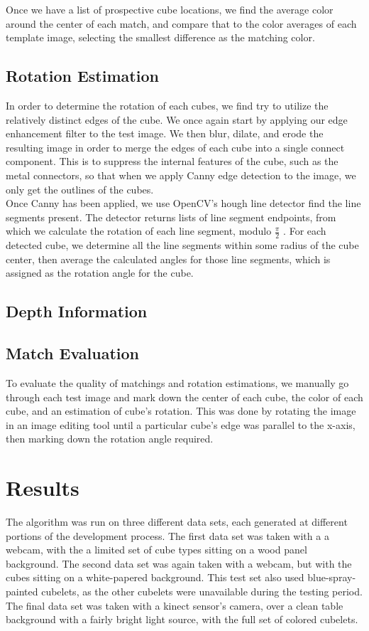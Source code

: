 \documentclass[conference]{IEEEtran}
\begin{document}
Once we have a list of prospective cube locations, we find the average color around the center of each match, and compare that to the color averages of each template image, selecting the smallest difference as the matching color.

\subsection{Rotation Estimation}
In order to determine the rotation of each cubes, we find try to utilize the relatively distinct edges of the cube.  We once again start by applying our edge enhancement filter to the test image.  We then blur, dilate, and erode the resulting image in order to merge the edges of each cube into a single connect component.  This is to suppress the internal features of the cube, such as the metal connectors, so that when we apply Canny edge detection to the image, we only get the outlines of the cubes.  \\

Once Canny has been applied, we use OpenCV's hough line detector find the line segments present.  The detector returns lists of line segment endpoints, from which we calculate the rotation of each line segment, modulo $ \frac{\pi}{2}$ .  For each detected cube, we determine all the line segments within some radius of the cube center, then average the calculated angles for those line segments, which is assigned as the rotation angle for the cube.

\subsection{Depth Information}


\subsection{Match Evaluation}
To evaluate the quality of matchings and rotation estimations, we manually go through each test image and mark down the center of each cube, the color of each cube, and an estimation of cube's rotation. This was done by rotating the image in an image editing tool until a particular cube's edge was parallel to the x-axis, then marking down the rotation angle required.\\

\section{Results}
The algorithm was run on three different data sets, each generated at different portions of the development process.  The first data set was taken with a a webcam, with the a limited set of cube types sitting on a wood panel background.  The second data set was again taken with a webcam, but with the cubes sitting on a white-papered background.  This test set also used blue-spray-painted cubelets, as the other cubelets were unavailable during the testing period. The final data set was taken with a kinect sensor's camera, over a clean table background with a fairly bright light source, with the full set of colored cubelets.
\end{document}
